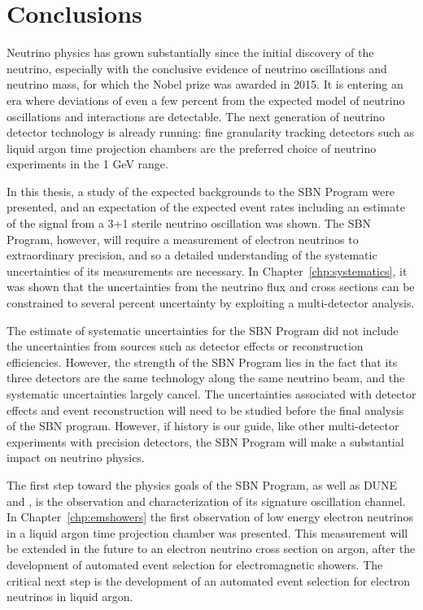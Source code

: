 \chapter{Conclusions} 

Neutrino physics has grown substantially since the initial discovery of the neutrino, especially with the conclusive evidence of neutrino oscillations and neutrino mass, for which the Nobel prize was awarded in 2015.  It is entering an era where deviations of even a few percent from the expected model of neutrino oscillations and interactions are detectable.  The next generation of neutrino detector technology is already running: fine granularity tracking detectors such as liquid argon time projection chambers are the preferred choice of neutrino experiments in the 1 GeV range.

In this thesis, a study of the expected backgrounds to the SBN Program were presented, and an expectation of the expected event rates including an estimate of the signal from a 3+1 sterile neutrino oscillation was shown.  The SBN Program, however, will require a measurement of electron neutrinos to extraordinary precision, and so a detailed understanding of the systematic uncertainties of its measurements are necessary.  In Chapter~\ref{chp:systematics}, it was shown that the uncertainties from the neutrino flux and cross sections can be constrained to several percent uncertainty by exploiting a multi-detector analysis.

The estimate of systematic uncertainties for the SBN Program did not include the uncertainties from sources such as detector effects or reconstruction efficiencies.  However, the strength of the SBN Program lies in the fact that its three detectors are the same technology along the same neutrino beam, and the systematic uncertainties largely cancel.  The uncertainties associated with detector effects and event reconstruction will need to be studied before the final analysis of the SBN program. However, if history is our guide, like other multi-detector experiments with precision detectors, the SBN Program will make a substantial impact on neutrino physics.

The first step toward the physics goals of the SBN Program, as well as DUNE and \uboone, is the observation and characterization of its signature oscillation channel.  In Chapter~\ref{chp:emshowers} the first observation of low energy electron neutrinos in a liquid argon time projection chamber was presented.  This measurement will be extended in the future to an electron neutrino cross section on argon, after the development of automated event selection for electromagnetic showers.  The critical next step is the development of an automated event selection for electron neutrinos in liquid argon.

